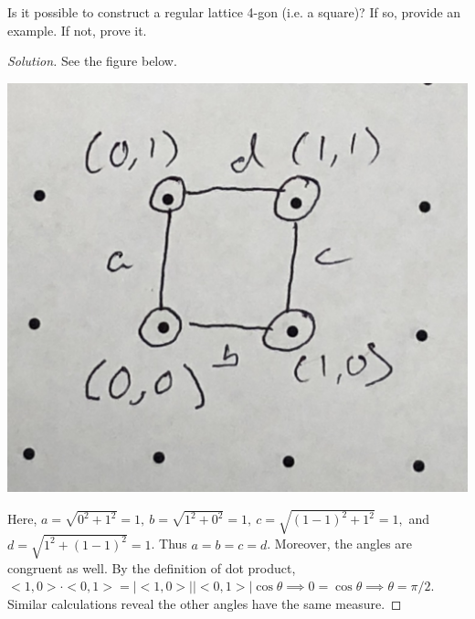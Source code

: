 \documentclass[12pt]{article}
\newenvironment{exercise}[2][Exercise]{\begin{trivlist}
        \item[\hskip \labelsep {\bfseries #1}\hskip \labelsep {\bfseries #2.}]}{\end{trivlist}}
\newenvironment{solution}
        {\begin{proof}[Solution]}
                    {\end{proof}}
\begin{document}
\begin{exercise}{2}
    Is it possible to construct a regular lattice 4-gon (i.e. a square)? If so, provide an example. If not, prove it.
    \begin{solution}
        See the figure below.
        \begin{center}
        \includegraphics[width=.3\linewidth]{2}
        \end{center}
        Here, \( a = \sqrt{0^{2} + 1^{2}} = 1, \ b = \sqrt{1^{2} + 0^{2}} = 1, \ c = \sqrt{(1-1)^{2} + 1^{2}} = 1, \) and \( d = \sqrt{1^{2} + ( 1-1 )^{2}} =1 \). Thus \( a=b=c=d \). Moreover, the angles are congruent as well. By the definition of dot product, \( <1,0> \cdot <0,1> = \left| <1,0> \right| \left| <0,1> \right| \cos \theta \implies 0 = \cos \theta \implies \theta = \pi/2.\) Similar calculations reveal the other angles have the same measure.
    \end{solution}
\end{exercise}
\end{document}
